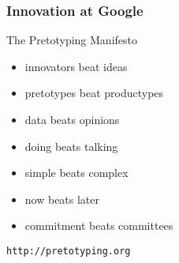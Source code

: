 \begin{frame}
\frametitle{Innovation at Google}

The Pretotyping Manifesto

\begin{itemize}
    \item innovators beat ideas 
    \item pretotypes beat productypes 
    \item data beats opinions 
    \item doing beats talking 
    \item simple beats complex 
    \item now beats later 
    \item commitment beats committees
\end{itemize}

\texttt{http://pretotyping.org}

\end{frame}
